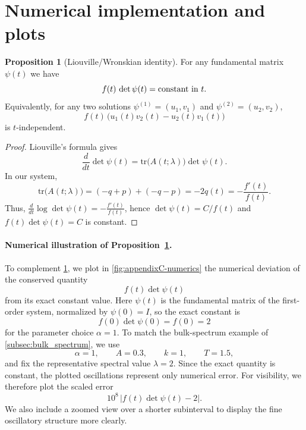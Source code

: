 \documentclass[11pt]{article}
\theoremstyle{definition}
\newtheorem{proposition}[theorem]{Proposition}
\numberwithin{equation}{section}
\begin{document}
\section{Numerical implementation and plots}\label{sec:numerics}








\begin{proposition}[Liouville/Wronskian identity]\label{prop:liouville}
For any fundamental matrix $\psi(t)$ we have
\begin{equation}
f(t)\,\det\psi(t)=\textup{constant in }t.
\end{equation}
Equivalently, for any two solutions $\psi^{(1)}=(u_1,v_1)$ and $\psi^{(2)}=(u_2,v_2)$,
\begin{equation}
f(t)\,\bigl(u_1(t)v_2(t)-u_2(t)v_1(t)\bigr)
\end{equation}
is $t$-independent.
\end{proposition}

\begin{proof}
Liouville's formula gives
\begin{equation}
\frac{d}{dt}\det\psi(t)=\mathrm{tr}\bigl(A(t;\lambda)\bigr)\det\psi(t).
\end{equation}
In our system,
\begin{equation}
\mathrm{tr}\bigl(A(t;\lambda)\bigr)=(-q+p)+(-q-p)=-2q(t)=-\frac{f'(t)}{f(t)}.
\end{equation}
Thus, $\frac{d}{dt}\log\det\psi(t)=-\frac{f'(t)}{f(t)}$, hence $\det\psi(t)=C/f(t)$ and $f(t)\det\psi(t)=C$ is constant.
\end{proof}


\paragraph{Numerical illustration of Proposition~\ref{prop:liouville}.}
To complement \ref{prop:liouville}, we plot in \autoref{fig:appendixC-numerics} the numerical deviation of the conserved quantity
\begin{equation}
f(t)\det\psi(t)
\end{equation}
from its exact constant value. Here \(\psi(t)\) is the fundamental matrix of the first-order system, normalized by \(\psi(0)=I\), so the exact constant is
\begin{equation}
f(0)\det\psi(0)=f(0)=2
\end{equation}
for the parameter choice \(\alpha=1\). To match the bulk-spectrum example of \autoref{subsec:bulk_spectrum}, we use
\begin{equation}
\alpha=1,\qquad A=0.3,\qquad k=1,\qquad T=1.5,
\end{equation}
and fix the representative spectral value \(\lambda=2\). Since the exact quantity is constant, the plotted oscillations represent only numerical error. For visibility, we therefore plot the scaled error
\begin{equation}
10^{8}\,\bigl|f(t)\det\psi(t)-2\bigr|.
\end{equation}
We also include a zoomed view over a shorter subinterval to display the fine oscillatory structure more clearly.
\end{document}
